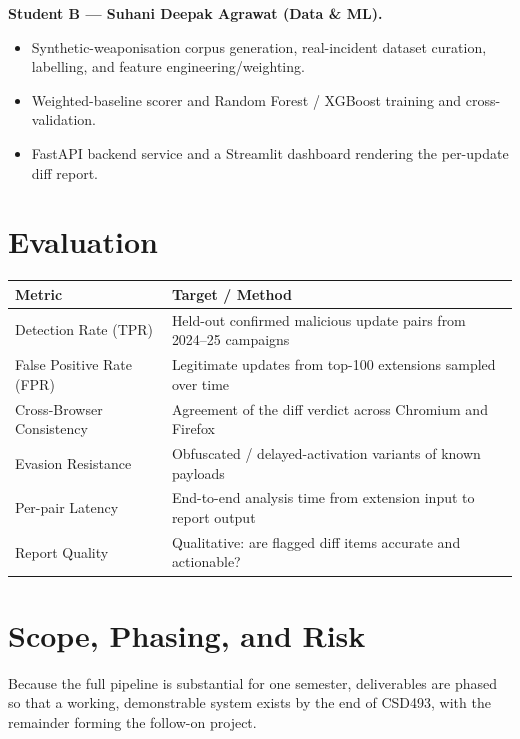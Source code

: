 \documentclass[11pt]{article}
\newcommand{\dem}[1]{\textbf{#1}}
\begin{document}
\dem{Student B --- Suhani Deepak Agrawat (Data \& ML).}
\begin{itemize}[leftmargin=1.4em,itemsep=0.1em]
\item Synthetic-weaponisation corpus generation, real-incident dataset curation, labelling, and
feature engineering/weighting.
\item Weighted-baseline scorer and Random Forest / XGBoost training and cross-validation.
\item FastAPI backend service and a Streamlit dashboard rendering the per-update diff report.
\end{itemize}

\section{Evaluation}
\begin{center}
\begin{tabular}{@{}ll@{}}
\toprule
\textbf{Metric} & \textbf{Target / Method}\\
\midrule
Detection Rate (TPR)      & Held-out confirmed malicious update pairs from 2024--25 campaigns \\
False Positive Rate (FPR) & Legitimate updates from top-100 extensions sampled over time \\
Cross-Browser Consistency & Agreement of the diff verdict across Chromium and Firefox \\
Evasion Resistance        & Obfuscated / delayed-activation variants of known payloads \\
Per-pair Latency          & End-to-end analysis time from extension input to report output \\
Report Quality            & Qualitative: are flagged diff items accurate and actionable? \\
\bottomrule
\end{tabular}
\end{center}

\section{Scope, Phasing, and Risk}
Because the full pipeline is substantial for one semester, deliverables are phased so that a working,
demonstrable system exists by the end of CSD493, with the remainder forming the follow-on project.
\end{document}

